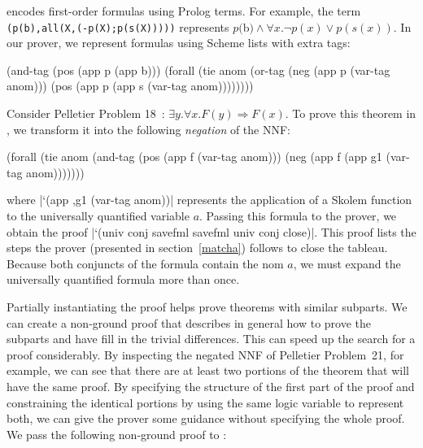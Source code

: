 \leantapsp encodes first-order formulas using Prolog terms.  For
example, the term \mbox{\texttt{(p(b),all(X,(-p(X);p(s(X)))))}}
represents \mbox{$p($\textsf{b}$) \wedge \forall x . \neg p(x) \vee
  p(s(x))$}. In our prover, we represent formulas using Scheme lists
with extra tags:


\schemedisplayspace
\begin{schemeresponse}
(and-tag (pos (app p (app b))) (forall (tie anom (or-tag (neg (app p (var-tag anom))) 
                                                     (pos (app p (app s (var-tag anom))))))))

\end{schemeresponse}


Consider Pelletier Problem 18~\cite{pelletier1986sfp}: \mbox{$\exists
  y.  \forall x. F(y) \Rightarrow F(x)$}. To prove this theorem in
\alphatap, we transform it into the following \textit{negation} of the
NNF:

\schemedisplayspace
\begin{schemeresponse}
(forall (tie anom (and-tag (pos (app f (var-tag anom))) (neg (app f (app g1 (var-tag anom)))))))
\end{schemeresponse}

\noindent where \schemeresult|`(app ,g1 (var-tag anom))| represents the
application of a Skolem function to the universally quantified
variable $a$. Passing this formula to the prover, we obtain the proof
\schemeresult|`(univ conj savefml savefml univ conj close)|. This proof
lists the steps the prover (presented in section~\ref{matcha}) follows to close
the tableau. Because both conjuncts of the formula contain the nom
$a$, we must expand the universally quantified formula more than once.

Partially instantiating the proof helps \alphatapsp prove theorems
with similar subparts. We can create a non-ground proof that describes
in general how to prove the subparts and have \alphatapsp fill in the
trivial differences. This can speed up the search for a proof
considerably. By inspecting the negated NNF of Pelletier Problem~21,
for example, we can see that there are at least two portions of the
theorem that will have the same proof. By specifying the structure of
the first part of the proof and constraining the identical portions by
using the same logic variable to represent both, we can give the
prover some guidance without specifying the whole proof. We pass the
following non-ground proof to \alphatap:

